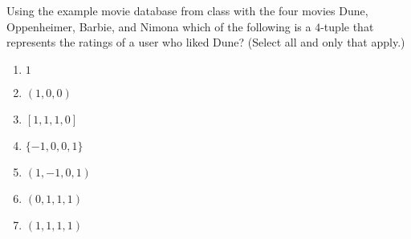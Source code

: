 
Using the example movie database from class with the four movies Dune, Oppenheimer, Barbie, and Nimona which of the following is a $4$-tuple that represents the ratings of a user who liked Dune? (Select all and only that apply.)

\begin{enumerate}
\item $1$
\item $(1,0,0)$
\item $[1,1,1,0]$
\item $\{-1, 0, 0, 1\}$
\item $(1,-1,0,1)$
\item $(0,1,1, 1)$
\item $(1,1,1,1)$
\end{enumerate}